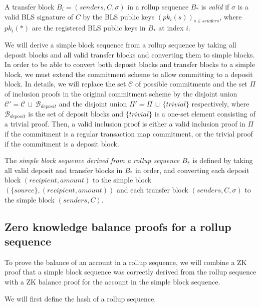 \begin{defn}
  A transfer block \(B_i = (senders, C, \sigma)\) in a rollup sequence \(B_*\) is \emph{valid} if \(\sigma\) is a valid BLS signature of \(C\) by the BLS public keys \((pk_i(s))_{s \in senders}\), where \(pk_i(*)\) are the registered BLS public keys in \(B_*\) at index \(i\).
\end{defn}

We will derive a simple block sequence from a rollup sequence by taking all deposit blocks and all valid transfer blocks and converting them to simple blocks. In order to be able to convert both deposit blocks and transfer blocks to a simple block, we must extend the commitment scheme to allow committing to a deposit block. In details, we will replace the set \(\mathcal{C}\) of possible commitments and the set \(\Pi\) of inclusion proofs in the original commitment scheme by the disjoint union \(\mathcal{C}' = \mathcal{C} \, \sqcup \, \mathcal{B}_{deposit}\) and the disjoint union \(\Pi' = \Pi \, \sqcup \, \{trivial\}\) respectively, where \(\mathcal{B}_{deposit}\) is the set of deposit blocks and \(\{trivial\}\) is a one-set element consisting of a trivial proof. Then, a valid inclusion proof is either a valid inclusion proof in \(\Pi\) if the commitment is a regular transaction map commitment, or the trivial proof if the commitment is a deposit block.

\begin{defn}
  The \emph{simple block sequence derived from a rollup sequence \(B_*\)} is defined by taking all valid deposit and transfer blocks in \(B_*\) in order, and converting each deposit block \((recipient, amount)\) to the simple block \((\{source\}, (recipient, amount))\) and each transfer block \((senders, C, \sigma)\) to the simple block \((senders, C)\).
\end{defn}

\subsection{Zero knowledge balance proofs for a rollup sequence}

To prove the balance of an account in a rollup sequence, we will combine a ZK proof that a simple block sequence was correctly derived from the rollup sequence with a ZK balance proof for the account in the simple block sequence.

We will first define the hash of a rollup sequence.

